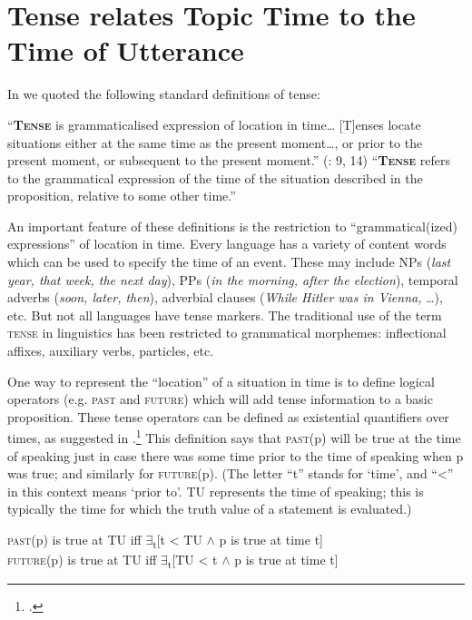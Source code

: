 \section{Tense relates Topic Time to the Time of Utterance}\label{sec:21.2}

In  we quoted the following standard definitions of tense:


\ea \label{ex:21.2}
\ea   “\textbf{\textsc{Tense}} is grammaticalised expression of location in time… [T]enses locate situations either at the same time as the present moment…, or prior to the present moment, or subsequent to the present moment.” (\citealt{Comrie1985}: 9, 14)
\ex   “\textbf{\textsc{Tense}} refers to the grammatical expression of the time of the situation described in the proposition, relative to some other time.” \citep{Bybee1985}
\z \z


An important feature of these definitions is the restriction to “grammatical(ized) expressions” of location in time. Every language has a variety of content words which can be used to specify the time of an event. These may include NPs (\textit{last year, that week, the next day}), PPs (\textit{in the morning, after the election}), temporal adverbs (\textit{soon, later, then}), adverbial clauses (\textit{While Hitler was in Vienna,} …), etc. But not all languages have tense markers. The traditional use of the term \textsc{tense} in linguistics has been restricted to grammatical morphemes: inflectional affixes, auxiliary verbs, particles, etc.



One way to represent the “location” of a situation in time is to define logical operators (e.g. \textsc{past} and \textsc{future}) which will add tense information to a basic proposition. These tense operators can be defined as existential quantifiers over times, as suggested in .\footnote{\citet{Prior1957,Prior1967}.} This definition says that \textsc{past}(p) will be true at the time of speaking just in case there was some time prior to the time of speaking when p was true; and similarly for \textsc{future}(p). (The letter “t” stands for ‘time’, and “<” in this context means ‘prior to’. TU represents the time of speaking; this is typically the time for which the truth value of a statement is evaluated.)


\ea \label{ex:21.3}
\textsc{past}(p) is true at TU  iff  ${\exists}$\textsubscript{t}[t < TU $\wedge$ p is true at time t]\\
\textsc{future}(p) is true at TU  iff  ${\exists}$\textsubscript{t}[TU < t $\wedge$ p is true at time t]
\z


